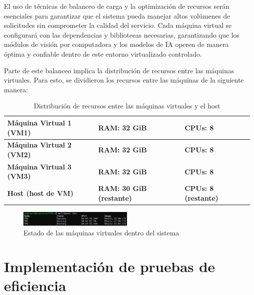 El uso de técnicas de balanceo de carga y la optimización de recursos serán esenciales para garantizar que el sistema pueda manejar altos volúmenes de solicitudes sin comprometer la calidad del servicio. Cada máquina virtual se configurará con las dependencias y bibliotecas necesarias, garantizando que los módulos de visión por computadora y los modelos de IA operen de manera óptima y confiable dentro de este entorno virtualizado controlado.

Parte de este balanceo implica la distribución de recursos entre las máquinas virtuales. Para esto, se dividieron los recursos entre las máquinas de la siguiente manera:

\renewcommand{\arraystretch}{1.3} %
\begin{table}[H]
\centering
\begin{tabularx}{\textwidth}{|m{4.5cm}|m{4cm}|X|}
\hline
\textbf{Máquina Virtual 1 (VM1)} & \textbf{RAM: 32 GiB} & \textbf{CPUs: 8} \\ \hline
\textbf{Máquina Virtual 2 (VM2)} & \textbf{RAM: 32 GiB} & \textbf{CPUs: 8} \\ \hline
\textbf{Máquina Virtual 3 (VM3)} & \textbf{RAM: 32 GiB} & \textbf{CPUs: 8} \\ \hline
\textbf{Host (host de VM)} & \textbf{RAM: 30 GiB (restante)} & \textbf{CPUs: 8 (restante)} \\ \hline
\end{tabularx}
\caption{Distribución de recursos entre las máquinas virtuales y el host}
\label{tab:vm_resources}
\end{table}

\vspace{0.5cm}

\begin{figure}[H]
    \centering
    \includegraphics[width=0.5\textwidth]{figuras/EstadosVMs.png}
    \caption{Estado de las máquinas virtuales dentro del sistema}
    \label{fig:EstadosVMs}
\end{figure}

\section{Implementación de pruebas de eficiencia}

